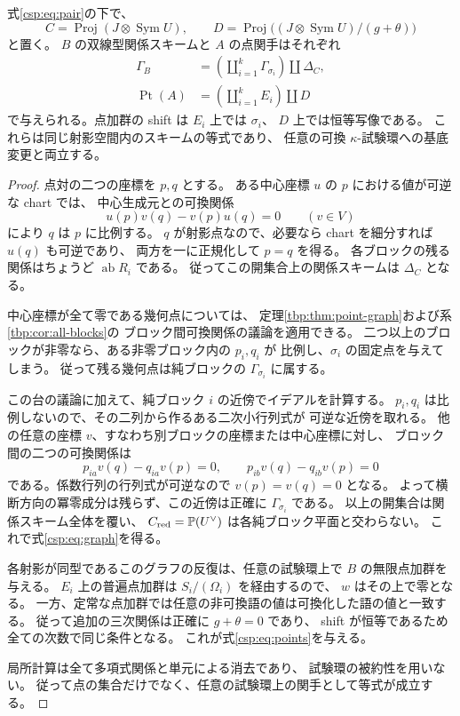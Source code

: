 \begin{theorem}[分離テンソル型の点グラフ]
\label{csp:thm:point-functor}
式\eqref{csp:eq:pair}の下で、
\begin{equation}\label{csp:eq:central-schemes}
 C=\operatorname{Proj}(J\otimes\operatorname{Sym}U),\qquad
 D=\operatorname{Proj}\bigl((J\otimes\operatorname{Sym}U)/(g+\theta)\bigr)
\end{equation}
と置く。
$B$ の双線型関係スキームと $A$ の点関手はそれぞれ
\begin{align}
 \Gamma_B&=\left(\coprod_{i=1}^k\Gamma_{\sigma_i}\right)\amalg\Delta_C,
 \label{csp:eq:graph}\\
 \operatorname{Pt}(A)&=\left(\coprod_{i=1}^kE_i\right)\amalg D
 \label{csp:eq:points}
\end{align}
で与えられる。点加群の shift は $E_i$ 上では $\sigma_i$、
$D$ 上では恒等写像である。
これらは同じ射影空間内のスキームの等式であり、
任意の可換 $\kappa$-試験環への基底変更と両立する。
\end{theorem}

\begin{proof}
点対の二つの座標を $p,q$ とする。
ある中心座標 $u$ の $p$ における値が可逆な chart では、
中心生成元との可換関係
\[
 u(p)v(q)-v(p)u(q)=0\qquad(v\in V)
\]
により $q$ は $p$ に比例する。
$q$ が射影点なので、必要なら chart を細分すれば $u(q)$ も可逆であり、
両方を一に正規化して $p=q$ を得る。
各ブロックの残る関係はちょうど $\operatorname{ab}R_i$ である。
従ってこの開集合上の関係スキームは $\Delta_C$ となる。

中心座標が全て零である幾何点については、
定理\ref{tbp:thm:point-graph}および系\ref{tbp:cor:all-blocks}の
ブロック間可換関係の議論を適用できる。
二つ以上のブロックが非零なら、ある非零ブロック内の $p_i,q_i$ が
比例し、$\sigma_i$ の固定点を与えてしまう。
従って残る幾何点は純ブロックの $\Gamma_{\sigma_i}$ に属する。

この台の議論に加えて、純ブロック $i$ の近傍でイデアルを計算する。
$p_i,q_i$ は比例しないので、その二列から作るある二次小行列式が
可逆な近傍を取れる。
他の任意の座標 $v$、すなわち別ブロックの座標または中心座標に対し、
ブロック間の二つの可換関係は
\[
 p_{ia}v(q)-q_{ia}v(p)=0,\qquad
 p_{ib}v(q)-q_{ib}v(p)=0
\]
である。係数行列の行列式が可逆なので $v(p)=v(q)=0$ となる。
よって横断方向の冪零成分は残らず、この近傍は正確に
$\Gamma_{\sigma_i}$ である。
以上の開集合は関係スキーム全体を覆い、
$C_{\mathrm{red}}=\mathbb P(U^\vee)$ は各純ブロック平面と交わらない。
これで式\eqref{csp:eq:graph}を得る。

各射影が同型であるこのグラフの反復は、任意の試験環上で
$B$ の無限点加群を与える。
$E_i$ 上の普遍点加群は $S_i/(\Omega_i)$ を経由するので、
$w$ はその上で零となる。
一方、定常な点加群では任意の非可換語の値は可換化した語の値と一致する。
従って追加の三次関係は正確に $g+\theta=0$ であり、
shift が恒等であるため全ての次数で同じ条件となる。
これが式\eqref{csp:eq:points}を与える。

局所計算は全て多項式関係と単元による消去であり、
試験環の被約性を用いない。
従って点の集合だけでなく、任意の試験環上の関手として等式が成立する。
\end{proof}

